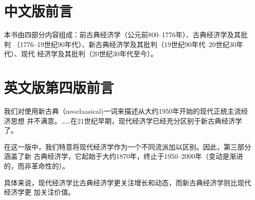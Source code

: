 \chapter{中文版前言}

本书由四部分内容组成：前古典经济学（公元前800--1776年）、古典经济学及其批判
（1776--19世纪90年代）、新古典经济学及其批判（19世纪90年代--20世纪30年代）、现代
经济学及其批判（20世纪30年代至今）。

\chapter{英文版第四版前言}

我们对使用新古典（neoclaasical)一词来描述从大约1950年开始的现代正统主流经济思想
并不满意。……在21世纪早期，现代经济学已经充分区别于新古典经济学了。

在这一版中，我们特意将现代经济学作为一个不同流派加以区别。因此，第三部分涵盖了新
古典经济学，它起始于大约1870年，终止于1950--2000年（变动是渐进的，而非革命性的）。

具体来说，现代经济学比古典经济学更关注增长和动态，而新古典经济学则比现代经济学更
加关注价值。
